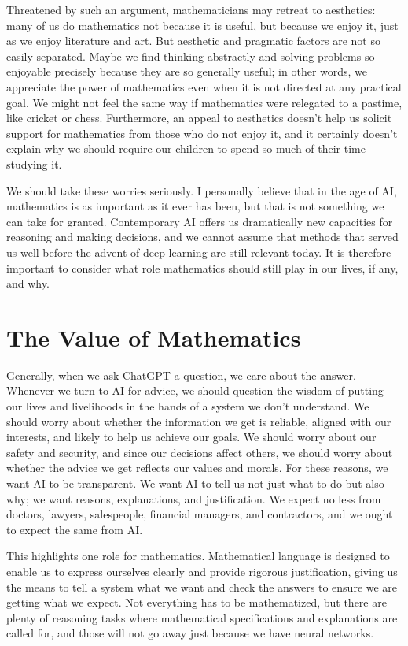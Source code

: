 \documentclass[11pt]{article}
\begin{document}
Threatened by such an argument, mathematicians may retreat to aesthetics: many of us do mathematics not because it is useful, but because we enjoy it, just as we enjoy literature and art. But aesthetic and pragmatic factors are not so easily separated. Maybe we find thinking abstractly and solving problems so enjoyable precisely because they are so generally useful; in other words, we appreciate the power of mathematics even when it is not directed at any practical goal. We might not feel the same way if mathematics were relegated to a pastime, like cricket or chess. Furthermore, an appeal to aesthetics doesn't help us solicit support for mathematics from those who do not enjoy it, and it certainly doesn't explain why we should require our children to spend so much of their time studying it.

We should take these worries seriously. I personally believe that in the age of AI, mathematics is as important as it ever has been, but that is not something we can take for granted. Contemporary AI offers us dramatically new capacities for reasoning and making decisions, and we cannot assume that methods that served us well before the advent of deep learning are still relevant today. It is therefore important to consider what role mathematics should still play in our lives, if any, and why.

\section{The Value of Mathematics}

Generally, when we ask ChatGPT a question, we care about the answer. Whenever we turn to AI for advice, we should question the wisdom of putting our lives and livelihoods in the hands of a system we don't understand. We should worry about whether the information we get is reliable, aligned with our interests, and likely to help us achieve our goals. We should worry about our safety and security, and since our decisions affect others, we should worry about whether the advice we get reflects our values and morals. For these reasons, we want AI to be transparent. We want AI to tell us not just what to do but also why; we want reasons, explanations, and justification. We expect no less from doctors, lawyers, salespeople, financial managers, and contractors, and we ought to expect the same from AI.

This highlights one role for mathematics. Mathematical language is designed to enable us to express ourselves clearly and provide rigorous justification, giving us the means to tell a system what we want and check the answers to ensure we are getting what we expect. Not everything has to be mathematized, but there are plenty of reasoning tasks where mathematical specifications and explanations are called for, and those will not go away just because we have neural networks.
\end{document}
